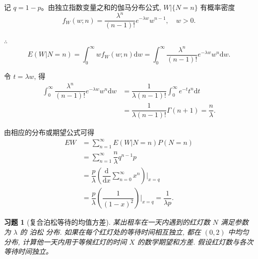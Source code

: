 \documentclass[UTF8,12pt,a4paper,fontset=fandol]{ctexart}
\newtheorem{exercise}{习题}[section]
\begin{document}
\begin{solve}\label{a:A6.3}
    记 $q=1-p$。由独立指数变量之和的伽马分布公式, $W|\{N=n\}$ 有概率密度
    \[f_W(w;n)=\dfrac{\lambda^n}{(n-1)!}e^{-\lambda w}w^{n-1},\quad w>0.\]

    $\therefore$
    \[E(W|N=n)=\int_0^\infty wf_W(w;n)\mathrm{d}w=\int_0^\infty\dfrac{\lambda^n}{(n-1)!}e^{-\lambda w}w^n\mathrm{d}w.\]

    令 $t=\lambda w$, 得
    \begin{align*}
        \int_0^\infty\dfrac{\lambda^n}{(n-1)!}e^{-\lambda w}w^n\mathrm{d}w & =\dfrac{1}{\lambda(n-1)!}\int_0^\infty e^{-t}t^n\mathrm{d}t \\
        & =\dfrac{1}{\lambda(n-1)!}\Gamma(n+1)=\dfrac{n}{\lambda}.
    \end{align*}

    由相应的分布或期望公式可得
    \begin{align*}
        EW & =\sum\limits_{n=1}^\infty E(W|N=n)P(N=n) \\
        & =\sum\limits_{n=1}^\infty\dfrac{n}{\lambda}q^{n-1}p \\
        & =\dfrac{p}{\lambda}\left(\dfrac{\mathrm{d}}{\mathrm{d}x}\sum\limits_{n=0}^\infty x^n\right)\Bigg|_{x=q} \\
        & =\dfrac{p}{\lambda}\left(\dfrac{1}{(1-x)^2}\right)\Bigg|_{x=q}=\dfrac{1}{\lambda p}.
    \end{align*}
\end{solve}

\begin{exercise}[复合泊松等待的均值方差]\label{q:A6.4}
某出租车在一天内遇到的红灯数 $N$ 满足参数为 $\lambda$ 的 泊松 分布. 如果在每个红灯处的等待时间相互独立, 都在 $(0,2)$ 中均匀分布, 计算他一天内用于等候红灯的时间 $X$ 的数学期望和方差. 假设红灯数与各次等待时间独立。\par{}
\end{exercise}
\end{document}
